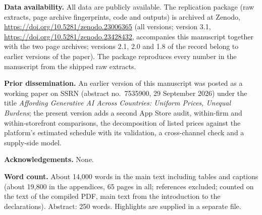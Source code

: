 \documentclass[11pt]{article}
\begin{document}
\textbf{Data availability.} All data are publicly available. The replication package (raw extracts, page archive fingerprints, code and outputs) is archived at Zenodo, \href{https://doi.org/10.5281/zenodo.23006365}{https://doi.org/10.5281/zenodo.23006365} (all versions; version 3.1, \href{https://doi.org/10.5281/zenodo.23428432}{https://doi.org/10.5281/zenodo.23428432}, accompanies this manuscript together with the two page archives; versions 2.1, 2.0 and 1.8 of the record belong to earlier versions of the paper). The package reproduces every number in the manuscript from the shipped raw extracts.

\textbf{Prior dissemination.} An earlier version of this manuscript was posted as a working paper on SSRN (abstract no.~7535900, 29 September 2026) under the title \emph{Affording Generative AI Across Countries: Uniform Prices, Unequal Burdens}; the present version adds a second App Store audit, within-firm and within-storefront comparisons, the decomposition of listed prices against the platform's estimated schedule with its validation, a cross-channel check and a supply-side model.

\textbf{Acknowledgements.} None.

\textbf{Word count.} About 14,000 words in the main text including tables and captions (about 19,800 in the appendices, 65 pages in all; references excluded; counted on the text of the compiled PDF, main text from the introduction to the declarations). Abstract: 250 words. Highlights are supplied in a separate file.
\end{document}
